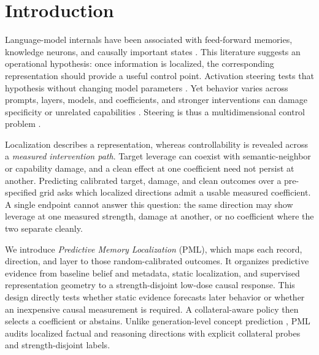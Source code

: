 \section{Introduction}

Language-model internals have been associated with feed-forward memories,
knowledge neurons, and causally important states
\citep{geva-etal-2021-transformer,dai-etal-2022-knowledge,
NEURIPS2022_6f1d43d5}. This literature suggests an operational hypothesis:
once information is localized, the corresponding representation should provide
a useful control point. Activation steering tests that hypothesis without changing model parameters
\citep{turner2023steering,rimsky-etal-2024-steering,zou2023representation,
pmlr-v235-singh24d}. Yet behavior varies across prompts, layers, models, and
coefficients, and stronger interventions can damage specificity or unrelated
capabilities \citep{NEURIPS2023_81b83900,stoehr-etal-2024-activation,
tan2024steering,goyal-iii-2026-steering}. Steering is thus a multidimensional
control problem \citep{wu25a,pres2024reliable,xu-etal-2026-controllable}.

Localization describes a representation, whereas controllability is revealed
across a \emph{measured intervention path}. Target leverage can coexist with
semantic-neighbor or capability damage, and a clean effect at one coefficient
need not persist at another. Predicting calibrated target, damage, and clean
outcomes over a pre-specified grid asks which localized directions admit a
usable measured coefficient. A single endpoint cannot answer this question:
the same direction may show leverage at one measured strength, damage at
another, or no coefficient where the two separate cleanly.

We introduce \emph{Predictive Memory Localization} (PML), which maps each
record, direction, and layer to those random-calibrated outcomes. It organizes
predictive evidence from baseline belief and metadata, static localization, and
supervised representation geometry to a strength-disjoint low-dose causal
response. This design directly tests whether static evidence forecasts later
behavior or whether an inexpensive causal measurement is required. A
collateral-aware policy then selects a coefficient or abstains.
Unlike generation-level concept prediction \citep{fan2026steerable}, PML audits
localized factual and reasoning directions with explicit collateral probes and
strength-disjoint labels.

